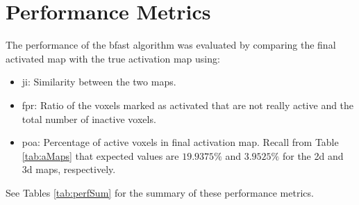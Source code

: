 \newpage

\section{Performance Metrics}

The performance of the \gls{bfast} algorithm was evaluated by comparing the final activated map with the true activation map using:

\begin{itemize}
\item \gls{ji}: Similarity between the two maps.
\item \gls{fpr}: Ratio of the voxels marked as activated that are not really active and the 
total number of inactive voxels.
\item \gls{poa}: Percentage of active voxels in final activation map. Recall from Table \ref{tab:aMaps} 
that expected values are $19.9375 \%$ and $3.9525 \%$ for the \gls{2d} and \gls{3d} maps, respectively.
\end{itemize}

See Tables \ref{tab:perfSum} for the summary of these performance metrics.


